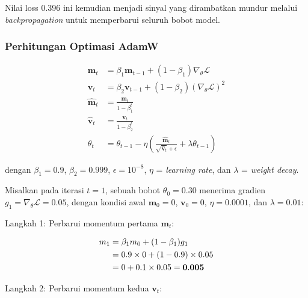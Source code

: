 \noindent
Nilai loss 0.396 ini kemudian menjadi sinyal yang dirambatkan mundur
melalui \textit{backpropagation} untuk memperbarui seluruh bobot
model.
 
 
\subsubsection{Perhitungan Optimasi AdamW}
 
\vspace{0.5cm}
\begin{equation}
\begin{aligned}
  \mathbf{m}_t &= \beta_1\mathbf{m}_{t-1}+(1-\beta_1)\nabla_\theta\mathcal{L} \\
  \mathbf{v}_t &= \beta_2\mathbf{v}_{t-1}+(1-\beta_2)(\nabla_\theta\mathcal{L})^2 \\
  \hat{\mathbf{m}}_t &= \frac{\mathbf{m}_t}{1-\beta_1^t} \\
  \hat{\mathbf{v}}_t  &= \frac{\mathbf{v}_t}{1-\beta_2^t} \\
  \theta_t &= \theta_{t-1}
            - \eta\!\left(
                \frac{\hat{\mathbf{m}}_t}{\sqrt{\hat{\mathbf{v}}_t}+\epsilon}
                +\lambda\theta_{t-1}
              \right)
\end{aligned}
\end{equation}
\vspace{0.5cm}
 
\noindent
dengan $\beta_1=0.9$, $\beta_2=0.999$, $\epsilon=10^{-8}$,
$\eta$ = \textit{learning rate}, dan $\lambda$ = \textit{weight decay}.
 
\noindent
Misalkan pada iterasi $t=1$, sebuah bobot $\theta_0 = 0.30$
menerima gradien $g_1 = \nabla_\theta\mathcal{L} = 0.05$,
dengan kondisi awal $\mathbf{m}_0 = 0$, $\mathbf{v}_0 = 0$,
$\eta = 0.0001$, dan $\lambda = 0.01$:
 
\vspace{0.5cm}
\noindent Langkah 1: Perbarui momentum pertama $\mathbf{m}_t$:
 
\vspace{0.5cm}
\begin{align*}
  m_1
  &= \beta_1 m_0 + (1-\beta_1) g_1 \notag \\
  &= 0.9 \times 0 + (1-0.9) \times 0.05 \notag \\
  &= 0 + 0.1 \times 0.05
   = \mathbf{0.005}
\end{align*}
\vspace{0.5cm}
 
\noindent Langkah 2: Perbarui momentum kedua $\mathbf{v}_t$:
 


